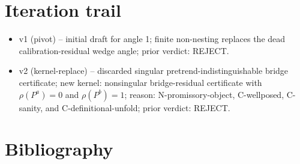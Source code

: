 \documentclass[11pt]{article}
\theoremstyle{definition}
\theoremstyle{plain}
\theoremstyle{remark}
\begin{document}
\section{Iteration trail}
\begin{itemize}[leftmargin=*]
\item v1 (pivot) -- initial draft for angle 1; finite non-nesting replaces the dead calibration-residual wedge angle; prior verdict: REJECT.
\item v2 (kernel-replace) -- discarded singular pretrend-indistinguishable bridge certificate; new kernel: nonsingular bridge-residual certificate with \(\rho(P^a)=0\) and \(\rho(P^b)=1\); reason: N-promissory-object, C-wellposed, C-sanity, and C-definitional-unfold; prior verdict: REJECT.
\end{itemize}

\section*{Bibliography}
\end{document}
